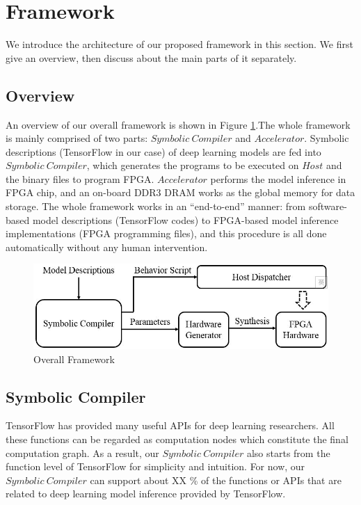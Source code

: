\documentclass{acm_proc_article-sp-copy}
\begin{document}
\section{Framework}
We introduce the architecture of our proposed framework in this section. We first give an overview, then discuss about the main parts of it separately.

\subsection{Overview}
An overview of our overall framework is shown in Figure \ref{framework}.The whole framework is mainly comprised of two parts: $Symbolic\ Compiler$ and $Accelerator$. Symbolic descriptions (TensorFlow in our case) of deep learning models are fed into $Symbolic\ Compiler$, which generates the programs to be executed on $Host$ and the binary files to program FPGA. $Accelerator$ performs the model inference in FPGA chip, and an on-board DDR3 DRAM works as the global memory for data storage. The whole framework works in an ``end-to-end'' manner: from software-based model descriptions (TensorFlow codes) to FPGA-based model inference implementations (FPGA programming files), and this procedure is all done automatically without any human intervention.

\begin{figure}
	\centering
	\includegraphics[width=1.0\linewidth]{./figure/framework.jpg}
	\caption{Overall Framework}
	\label{framework}
\end{figure}

\subsection{Symbolic Compiler}
TensorFlow has provided many useful APIs for deep learning researchers. All these functions can be regarded as computation nodes which constitute the final computation graph. As a result, our $Symbolic\ Compiler$ also starts from the function level of TensorFlow for simplicity and intuition. For now, our $Symbolic\ Compiler$ can support about XX \% of the functions or APIs that are related to deep learning model inference provided by TensorFlow.
\end{document}
